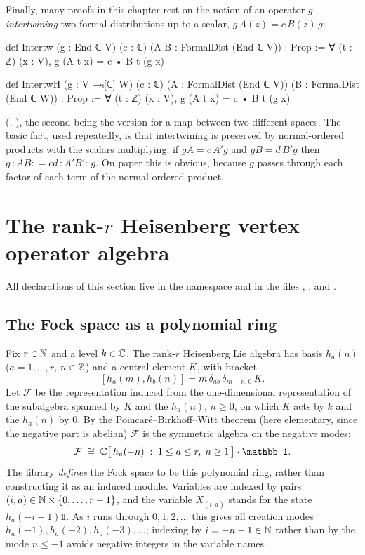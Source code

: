 Finally, many proofs in this chapter rest on the notion of an operator $g$ \emph{intertwining} two
formal distributions up to a scalar, $g\,A(z)=c\,B(z)\,g$:
\begin{leancode}
def Intertw (g : End ℂ V) (c : ℂ) (A B : FormalDist (End ℂ V)) : Prop :=
  ∀ (t : ℤ) (x : V), g (A t x) = c • B t (g x)

def IntertwH (g : V →ₗ[ℂ] W) (c : ℂ) (A : FormalDist (End ℂ V)) (B : FormalDist (End ℂ W)) :
    Prop :=
  ∀ (t : ℤ) (x : V), g (A t x) = c • B t (g x)
\end{leancode}
(, ),
the second being the version for a map between two different spaces. The basic fact, used
repeatedly, is that intertwining is preserved by normal-ordered products with the scalars
multiplying: if $gA=c\,A'g$ and $gB=d\,B'g$ then $g\,{:}AB{:}=cd\,{:}A'B'{:}\,g$. On paper this is
obvious, because $g$ passes through each factor of each term of the normal-ordered product.

\section{The rank-\texorpdfstring{$r$}{r} Heisenberg vertex operator algebra}\label{ch03:sec:heisenberg}

All declarations of this section live in the namespace  and in the files
, ,
 and .

\subsection{The Fock space as a polynomial ring}

Fix $r\in{\mathbb{N}}$ and a level $k\in{\mathbb{C}}$. The rank-$r$ Heisenberg Lie algebra has basis $h_a(n)$
($a=1,\dots,r$, $n\in{\mathbb{Z}}$) and a central element $K$, with bracket
\begin{equation}\label{ch03:eq:heisr}
  [h_a(m),h_b(n)] = m\,\delta_{ab}\,\delta_{m+n,0}\,K .
\end{equation}
Let $\mathcal F$ be the representation induced from the one-dimensional representation of the
subalgebra spanned by $K$ and the $h_a(n)$, $n\ge 0$, on which $K$ acts by $k$ and the $h_a(n)$ by
$0$. By the Poincar\'e--Birkhoff--Witt theorem (here elementary, since the negative part is
abelian) $\mathcal F$ is the symmetric algebra on the negative modes:
\begin{equation*}
  \mathcal F\;\cong\;\C\bigl[\,h_a(-n)\;:\;1\le a\le r,\;n\ge 1\,\bigr]\cdot \mathbb 1 .
\end{equation*}
The library \emph{defines} the Fock space to be this polynomial ring, rather than constructing it
as an induced module. Variables are indexed by pairs $(i,a)\in{\mathbb{N}}\times\{0,\dots,r-1\}$, and the
variable $X_{(i,a)}$ stands for the state $h_a(-i-1)\mathbb 1$. As $i$ runs through $0,1,2,\ldots$ this gives all
creation modes $h_a(-1),h_a(-2),h_a(-3),\ldots$; indexing by $i=-n-1\in{\mathbb{N}}$ rather than by the mode
$n\le-1$ avoids negative integers in the variable names.

